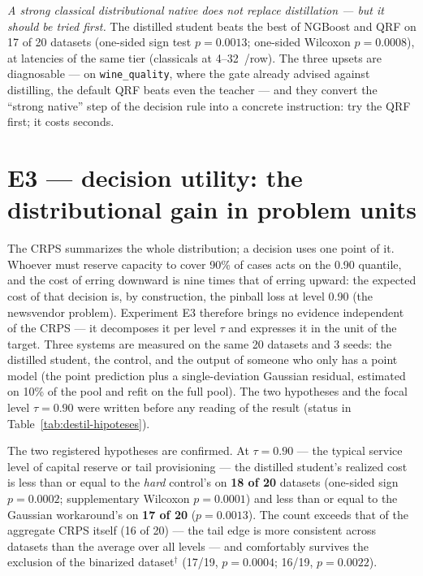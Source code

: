 \emph{A strong classical distributional native does not replace
distillation --- but it should be tried first.} The distilled
student beats the best of NGBoost and QRF on 17 of 20 datasets
(one-sided sign test $p=0.0013$; one-sided Wilcoxon $p=0.0008$), at
latencies of the same tier
(classicals at 4--32~\us/row). The three upsets are diagnosable ---
on \texttt{wine\_quality}, where the gate already advised against
distilling, the default QRF beats even the teacher --- and they
convert the ``strong native'' step of the decision rule into a
concrete instruction: try the QRF first; it costs seconds.

\section{E3 --- decision utility: the distributional gain in problem units}
\label{sec:destil-e3}

The CRPS summarizes the whole distribution; a decision uses one
point of it. Whoever must reserve capacity to cover 90\% of cases
acts on the 0.90 quantile, and the cost of erring downward is nine
times that of erring upward: the expected cost of that decision is,
by construction, the pinball loss at level 0.90 (the newsvendor
problem). Experiment E3 therefore brings no evidence independent of
the CRPS --- it decomposes it per level $\tau$ and expresses it in
the unit of the target. Three systems are measured on the same 20
datasets and 3 seeds: the distilled student, the control, and the
output of someone who only has a point model (the point prediction
plus a single-deviation Gaussian residual, estimated on 10\% of the
pool and refit on the full pool). The two hypotheses and the focal
level $\tau{=}0.90$ were written before any reading of the result
(status in Table~\ref{tab:destil-hipoteses}).

The two registered hypotheses are confirmed. At $\tau{=}0.90$ ---
the typical service level of capital reserve or tail provisioning
--- the distilled student's realized cost is less than or equal to
the \emph{hard} control's on \textbf{18 of 20} datasets (one-sided
sign $p{=}0.0002$; supplementary Wilcoxon $p{=}0.0001$) and less
than or equal to the Gaussian workaround's on \textbf{17 of 20}
($p{=}0.0013$). The count exceeds that of the aggregate CRPS itself
(16 of 20) --- the tail edge is more consistent across datasets than
the average over all levels --- and comfortably survives the
exclusion of the binarized dataset$^\dagger$ (17/19, $p{=}0.0004$;
16/19, $p{=}0.0022$).

